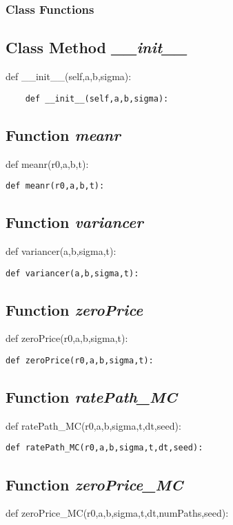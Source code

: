 \documentclass[twoside,11pt]{book}
\begin{document}
\subsubsection{Class Functions}

\subsection{Class Method {\it \_\_init\_\_}}
def \_\_init\_\_(self,a,b,sigma):

\begin{lstlisting}
    def __init__(self,a,b,sigma):
\end{lstlisting}

\subsection{Function {\it meanr}}
def meanr(r0,a,b,t):

\begin{lstlisting}
def meanr(r0,a,b,t):
\end{lstlisting}

\subsection{Function {\it variancer}}
def variancer(a,b,sigma,t):

\begin{lstlisting}
def variancer(a,b,sigma,t):
\end{lstlisting}

\subsection{Function {\it zeroPrice}}
def zeroPrice(r0,a,b,sigma,t):

\begin{lstlisting}
def zeroPrice(r0,a,b,sigma,t):
\end{lstlisting}

\subsection{Function {\it ratePath\_MC}}
def ratePath\_MC(r0,a,b,sigma,t,dt,seed):

\begin{lstlisting}
def ratePath_MC(r0,a,b,sigma,t,dt,seed):
\end{lstlisting}

\subsection{Function {\it zeroPrice\_MC}}
def zeroPrice\_MC(r0,a,b,sigma,t,dt,numPaths,seed):
\end{document}
